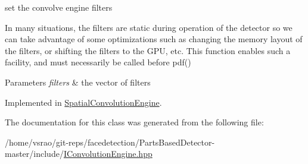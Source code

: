 set the convolve engine filters 

\begin{DoxyVerb}  In many situations, the filters are static during operation of the detector
  so we can take advantage of some optimizations such as changing the memory layout
  of the filters, or shifting the filters to the GPU, etc. This function enables
  such a facility, and must necessarily be called before pdf()
\end{DoxyVerb}



\begin{DoxyParams}{Parameters}
{\em filters} & the vector of filters \\
\hline
\end{DoxyParams}


Implemented in \hyperlink{classSpatialConvolutionEngine_ad27aad7b65dfa3ec6a617eed96c01d9c}{Spatial\-Convolution\-Engine}.



The documentation for this class was generated from the following file\-:\begin{DoxyCompactItemize}
\item 
/home/vsrao/git-\/reps/facedetection/\-Parts\-Based\-Detector-\/master/include/\hyperlink{IConvolutionEngine_8hpp}{I\-Convolution\-Engine.\-hpp}\end{DoxyCompactItemize}
